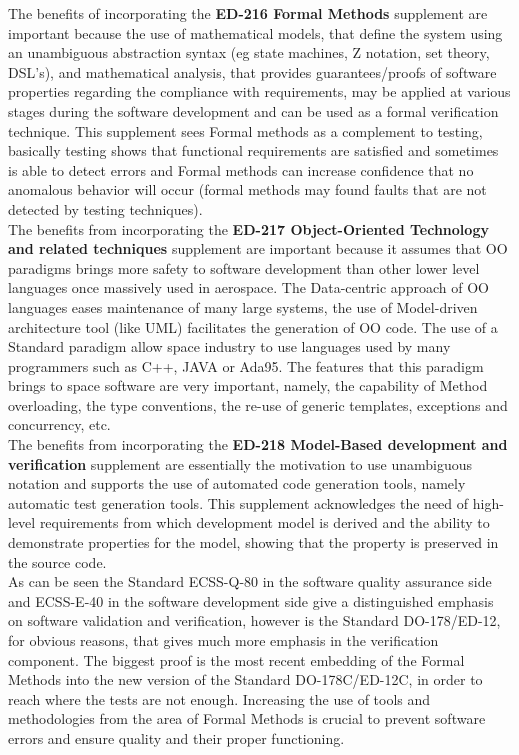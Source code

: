 {The benefits of incorporating the \textbf{ED-216 Formal Methods} supplement are important because
the use of mathematical models, that define the system using an unambiguous abstraction syntax (eg state machines, Z notation, set theory, \ac{DSL}'s),
and mathematical analysis, that provides guarantees/proofs of software properties regarding the compliance with requirements,
may be applied at various stages during the software development and can be used as a formal verification technique.
This supplement sees Formal methods as a complement to testing, basically testing shows that functional requirements
are satisfied and sometimes is able to detect errors and Formal methods can increase confidence that no anomalous behavior will occur
(formal methods may found faults that are not detected by testing techniques)\cite{Chelini:2009:WTD:1647420.1647443}.\\
The benefits from incorporating the \textbf{ED-217 Object-Oriented Technology and related techniques} supplement are important because
it assumes that \ac{OO} paradigms brings more safety to software development than other lower level languages once massively used in aerospace.
The Data-centric approach of \ac{OO} languages eases maintenance of many large systems, the use of Model-driven architecture tool (like \ac{UML}) facilitates
the generation of \ac{OO} code\cite{Elliott:2010:OSC:1869542.1869558}. The use of a Standard paradigm allow space industry to use languages used by many programmers such as C++, JAVA or Ada95.
The features that this paradigm brings to space software are very important, namely, the capability of Method overloading, the type conventions, the re-use of
generic templates, exceptions and concurrency, etc.\\
The benefits from incorporating the \textbf{ED-218 Model-Based development and verification} supplement are essentially the motivation to use unambiguous notation and supports the use of
automated code generation tools, namely automatic test generation tools\cite{Chelini:2009:WTD:1647420.1647443}. This supplement acknowledges the need of
high-level requirements from which development model is derived and the ability to demonstrate properties for the model, showing that the property 
is preserved in the source code.\\

As can be seen the Standard ECSS-Q-80\cite{ecss-q-st-80c} in the software quality assurance side and ECSS-E-40\cite{ecss-e-st-40c} in the software development side
give a distinguished emphasis on software validation and verification, however is the Standard DO-178/ED-12, for obvious reasons,
that gives much more emphasis in the verification component. The biggest proof is the most recent embedding of the Formal Methods into the
new version of the Standard DO-178C/ED-12C\cite{ed-12c}, in order to reach where the tests are not enough.
Increasing the use of tools and methodologies from the area of Formal Methods is crucial to prevent software errors and ensure quality and their proper functioning.

}
